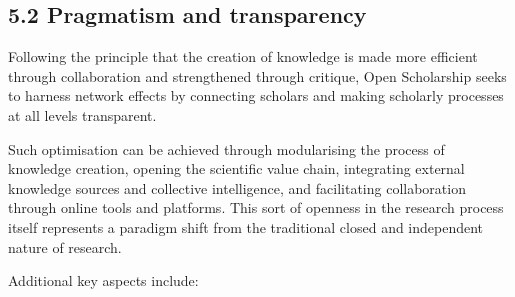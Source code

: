 \subsection{5.2 Pragmatism and transparency
}\label{pragmatism-and-transparency}

Following the principle that the creation of knowledge is made more
efficient through collaboration and strengthened through critique, Open
Scholarship seeks to harness network effects by connecting scholars and
making scholarly processes at all levels transparent.

Such optimisation can be achieved through modularising the process of
knowledge creation, opening the scientific value chain, integrating
external knowledge sources and collective intelligence, and facilitating
collaboration through online tools and platforms. This sort of openness
in the research process itself represents a paradigm shift from the
traditional closed and independent nature of research.

Additional key aspects include:

